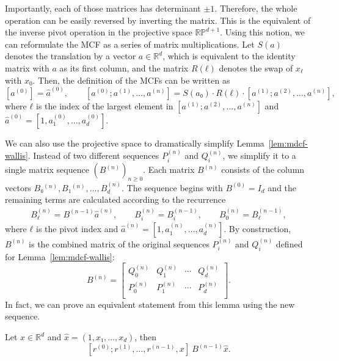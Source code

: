 Importantly, each of those matrices has
determinant $±1$.
Therefore, the whole operation can be easily reversed by inverting the matrix.
This is the equivalent of the inverse pivot operation in
the projective space $\mathbb{RP}^{d+1}$.
Using this notion, we can reformulate the MCF as a series of matrix multiplications.
Let $S(a)$ denotes the translation by a vector $a ∈ ℝ^d$,
which is equivalent to the identity matrix with $a$ as its first column,
and the matrix $R(ℓ)$ denotes the swap of $x_ℓ$ with $x_0$.
Then, the definition of the MCFs can be written as
\[
  [a^{(0)}] = \hat a^{(0)}, \qquad
  [a^{(0)}; a^{(1)}, …, a^{(n)}] = S(a₀) · R(ℓ) · [a^{(1)}; a^{(2)}, …, a^{(n)}],
\]
where $ℓ$ is the index of the largest element in $[a^{(1)}; a^{(2)}, …, a^{(n)}]$ and $\hat a^{(0)} = [1, a_1^{(0)}, …, a_d^{(0)}]$.

We can also use the projective space to dramatically simplify Lemma~\ref{lem:mdcf-wallis}.
Instead of two different sequences $P_i^{(n)}$ and $Q_i^{(n)}$, we simplify it to a single matrix sequence $(B^{(n)})_{n ≥ 0}$.
Each matrix $B^{(n)}$ consists of the column vectors $B₀^{(n)}, B₁^{(n)}, …, B_d^{(n)}$.
The sequence begins with $B^{(0)} = I_d$
and the remaining terms are calculated according to the recurrence
\begin{align*}
  B_ℓ^{(n)} = B^{(n-1)} \hat a^{(n)},
  \qquad B_i^{(n)} = B_i^{(n-1)},
  \qquad B_0^{(n)} = B_ℓ^{(n-1)},
\end{align*}
where $ℓ$ is the pivot index and $\hat a^{(n)} = [1, a_1^{(n)}, …, a_d^{(n)}]$.
By construction, $B^{(n)}$ is the combined matrix of the original sequences
$P_i^{(n)}$ and $Q_i^{(n)}$ defined for Lemma~\vref{lem:mdcf-wallis}:
\[
  B^{(n)} = \begin{bmatrix}
    Q_0^{(n)} & Q_1^{(n)} & ⋯ & Q_d^{(n)} \\
    P_0^{(n)} & P_1^{(n)} & ⋯ & P_d^{(n)} \\
  \end{bmatrix}.
\]
In fact, we can prove an equivalent statement from this lemma using the new sequence.

\begin{lemma}
  \label{lem:mdcf-wallis'}
  Let $x ∈ ℝ^d$ and $\hat x = (1, x₁, …, x_d)$, then
  \[
    [r^{(0)}; r^{(1)}, …, r^{(n-1)}, x] ~ B^{(n-1)} \hat x.
  \]
\end{lemma}

